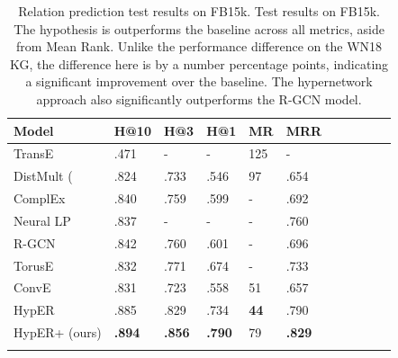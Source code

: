 \begin{table}[H]
		\centering
		\begin{tabular}{lllllllllll}
  			\textbf{Model} & \textbf{H@10} & \textbf{H@3} & \textbf{H@1} & \textbf{MR} & \textbf{MRR} \\
  			\hline
  			TransE \unskip~\citep{bordes2013translating} & .471 & - & - & 125 & - \\
  			DistMult (\unskip~\citep{yang2014embedding} & .824 & .733 & .546 & 97 & .654 \\
  			ComplEx \unskip~\citep{trouillon2016complex} & .840 & .759 & .599 & - & .692 \\
  			Neural LP \unskip~\citep{yang2017differentiable} & .837 & - & - & - & .760 \\
			R-GCN \unskip~\citep{schlichtkrull2018modeling} & .842 & .760 & .601 & - & .696 \\
			TorusE \unskip~\citep{ebisu2018toruse} & .832 & .771 & .674 & - & .733\\
			ConvE \unskip~\citep{dettmers2018convolutional} & .831 & .723 & .558 & 51 & .657 \\
			HypER \unskip~\citep{balazevic2019hypernetwork} & .885 & .829 & .734 & \textbf{44} & .790 \\
  			\hline
  			HypER+ (ours) & \textbf{.894} & \textbf{.856} & \textbf{.790} & 79 & \textbf{.829} \\
			&
		\end{tabular}
		\captionsetup{justification=centering}
		\caption{Relation prediction test results on FB15k. Test results on FB15k. The hypothesis is outperforms the baseline across all metrics, aside from Mean Rank. Unlike the performance difference on the WN18 KG, the difference here is by a number percentage points, indicating a significant improvement over the baseline. The hypernetwork approach also significantly outperforms the R-GCN model.}
\end{table}


